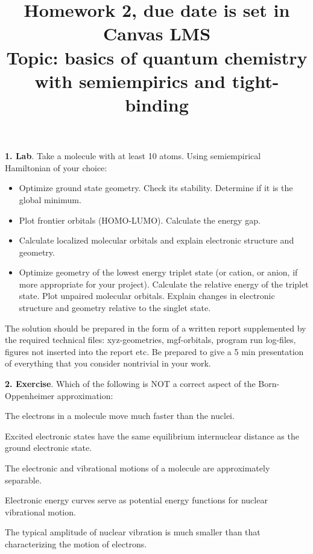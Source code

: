 \documentclass{homework}
\newcounter{tmp}
\begin{document}
\title{Homework 2, due date is set in Canvas LMS \\ Topic: basics of quantum chemistry with semiempirics and tight-binding}
\maketitle

\textbf{1. Lab}. Take a molecule with at least 10 atoms. Using semiempirical Hamiltonian of your choice:
\begin{itemize}\setlength{\itemsep}{0ex}
\item Optimize ground state geometry. Check its stability. Determine if it is the global minimum.
\item Plot frontier orbitals (HOMO-LUMO). Calculate the energy gap.
\item Calculate localized molecular orbitals and explain electronic structure and geometry.
\item Optimize geometry of the lowest energy triplet state (or cation, or anion, if more appropriate for your project). Calculate the relative energy of the triplet state. Plot unpaired molecular orbitals. Explain changes in electronic structure and geometry relative to the singlet state.
\end{itemize}
The solution should be prepared in the form of a written report supplemented by the required technical files: xyz-geometries, mgf-orbitals, program run log-files, figures not inserted into the report etc. Be prepared to give a 5 min presentation of everything that you consider nontrivial in your work.

\bigskip

\textbf{2. Exercise}. Which of the following is NOT a correct aspect of the Born-Oppenheimer approximation:
\begin{list}{()}{}\setlength{\itemsep}{0ex}
\item The electrons in a molecule move much faster than the nuclei.
\item Excited electronic states have the same equilibrium internuclear distance as the ground electronic state.
\item The electronic and vibrational motions of a molecule are approximately separable.
\item Electronic energy curves serve as potential energy functions for nuclear vibrational motion.
\item The typical amplitude of nuclear vibration is much smaller than that characterizing the motion of electrons.
\end{list}
\end{document}
